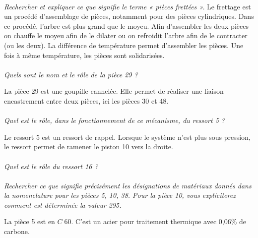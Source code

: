 \documentclass[11pt,oneside]{article}
\begin{document}
\paragraph{}
\textit{Rechercher et expliquer ce que signifie le terme « pièces frettées ».}
Le frettage est un procédé d'assemblage de pièces, notamment pour des pièces cylindriques.
Dans ce procédé, l'arbre est plus grand que le moyeu. Afin d'assembler les deux pièces on chauffe le moyeu afin de le dilater ou on refroidit l'arbre afin de le contracter (ou les deux). La différence de température permet d'assembler les pièces. Une fois à même température, les pièces sont solidarisées.


\paragraph{}
\textit{Quels sont le nom et le rôle de la pièce 29 ?}

La pièce 29 est une goupille cannelée. Elle permet de réaliser une liaison encastrement entre deux pièces, ici les pièces 30 et 48. 

\paragraph{}
\textit{Quel est le rôle, dans le fonctionnement de ce mécanisme, du ressort 5 ?}

Le ressort 5 est un ressort de rappel. Lorsque le système n'est plus sous pression, le ressort permet de ramener le piston 10 vers la droite. 

\paragraph{}
\textit{Quel est le rôle du ressort 16 ?}

\paragraph{}
\textit{Rechercher ce que signifie précisément les désignations de matériaux donnés dans la nomenclature pour les pièces 5, 10, 38. Pour la pièce 10, vous expliciterez comment est déterminée la valeur 295. }

La pièce 5 est en $C\;60$. C'est un acier pour traitement thermique avec 0,06\% de carbone.
\end{document}
